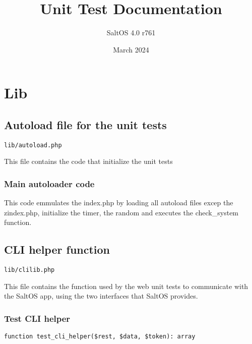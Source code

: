 \documentclass[a4paper]{article}
\title{Unit Test Documentation}
\author{SaltOS 4.0 r761}
\begin{document}
\date{March 2024}
\maketitle
\clearpage

\tableofcontents
\clearpage


\hypertarget{toc1}{}
\section{Lib}

\hypertarget{toc2}{}
\subsection{Autoload file for the unit tests}

\begin{lstlisting}
lib/autoload.php
\end{lstlisting}

This file contains the code that initialize the unit tests

\hypertarget{toc3}{}
\subsubsection{Main autoloader code}

This code emmulates the index.php by loading all autoload files excep
the zindex.php, initialize the timer, the random and executes the
check\_system function.

\hypertarget{toc4}{}
\subsection{CLI helper function}

\begin{lstlisting}
lib/clilib.php
\end{lstlisting}

This file contains the function used by the web unit tests to communicate with the
SaltOS app, using the two interfaces that SaltOS provides.

\hypertarget{toc5}{}
\subsubsection{Test CLI helper}

\begin{lstlisting}
function test_cli_helper($rest, $data, $token): array
\end{lstlisting}
\end{document}
